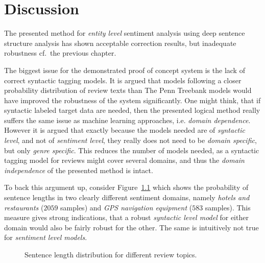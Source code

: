 
\chapter{Discussion}
\label{chap:discussion}

The presented method for \emph{entity level} sentiment analysis using deep sentence structure analysis has shown acceptable correction results, but inadequate robustness cf.\ the previous chapter.

The biggest issue for the demonstrated proof of concept system is the lack of correct syntactic tagging models. It is argued that models following a closer probability distribution of review texts than The Penn Treebank models would have improved the robustness of the system significantly. One might think, that if syntactic labeled target data are needed, then the presented logical method really suffers the same issue as machine learning approaches, i.e. \emph{domain dependence}. However it is argued that exactly because the models needed are of \emph{syntactic level}, and not of \emph{sentiment level}, they really does not need to be \emph{domain specific}, but only \emph{genre specific}. This reduces the number of models needed, as a syntactic tagging model for reviews might cover several domains, and thus the \emph{domain independence} of the presented method is intact.

To back this argument up, consider Figure~\ref{fig:distBias2} which shows the probability of sentence lengths in two clearly different sentiment domains, namely \emph{hotels and restaurants} ($\num{2059}$ samples) and \emph{GPS navigation equipment} ($\num{583}$ samples). This measure gives strong indications, that a robust \emph{syntactic level model} for either domain would also be fairly robust for the other. The same is intuitively not true for \emph{sentiment level models}.
\begin{figure}[ht]
\begin{center}
\end{center}
\vspace{-1em}
\caption{Sentence length distribution for different review topics.}
\label{fig:distBias2}
\end{figure}

